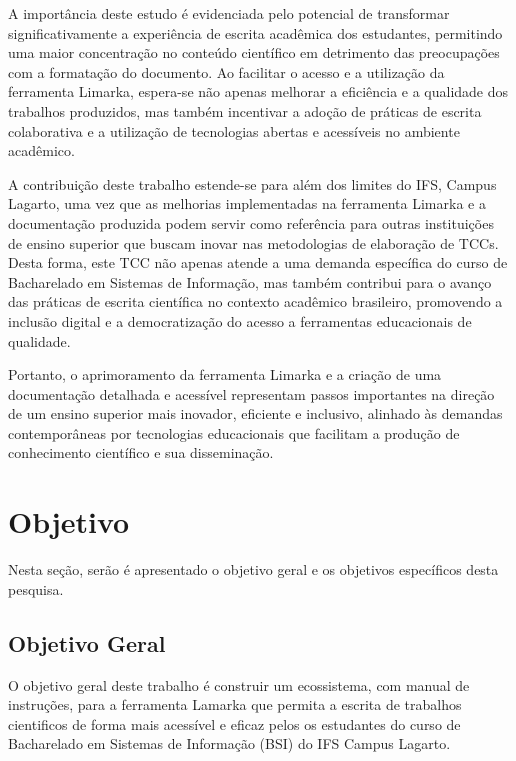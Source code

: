 \documentclass[
	12pt,				%
	oneside,			%
	a4paper,			%
	english,			%
	french,				%
	spanish,			%
	brazil				%
	]{abntex2}
\begin{document}
A importância deste estudo é evidenciada pelo potencial de transformar
significativamente a experiência de escrita acadêmica dos estudantes,
permitindo uma maior concentração no conteúdo científico em detrimento
das preocupações com a formatação do documento. Ao facilitar o acesso e
a utilização da ferramenta Limarka, espera-se não apenas melhorar a
eficiência e a qualidade dos trabalhos produzidos, mas também incentivar
a adoção de práticas de escrita colaborativa e a utilização de
tecnologias abertas e acessíveis no ambiente acadêmico.

A contribuição deste trabalho estende-se para além dos limites do IFS,
Campus Lagarto, uma vez que as melhorias implementadas na ferramenta
Limarka e a documentação produzida podem servir como referência para
outras instituições de ensino superior que buscam inovar nas
metodologias de elaboração de TCCs. Desta forma, este TCC não apenas
atende a uma demanda específica do curso de Bacharelado em Sistemas de
Informação, mas também contribui para o avanço das práticas de escrita
científica no contexto acadêmico brasileiro, promovendo a inclusão
digital e a democratização do acesso a ferramentas educacionais de
qualidade.

Portanto, o aprimoramento da ferramenta Limarka e a criação de uma
documentação detalhada e acessível representam passos importantes na
direção de um ensino superior mais inovador, eficiente e inclusivo,
alinhado às demandas contemporâneas por tecnologias educacionais que
facilitam a produção de conhecimento científico e sua disseminação.

\hypertarget{objetivo}{%
\section{Objetivo}\label{objetivo}}

Nesta seção, serão é apresentado o objetivo geral e os objetivos
específicos desta pesquisa.

\hypertarget{objetivo-geral}{%
\subsection{Objetivo Geral}\label{objetivo-geral}}

O objetivo geral deste trabalho é construir um ecossistema, com manual
de instruções, para a ferramenta Lamarka que permita a escrita de
trabalhos cientificos de forma mais acessível e eficaz pelos os
estudantes do curso de Bacharelado em Sistemas de Informação (BSI) do
IFS Campus Lagarto.
\end{document}
